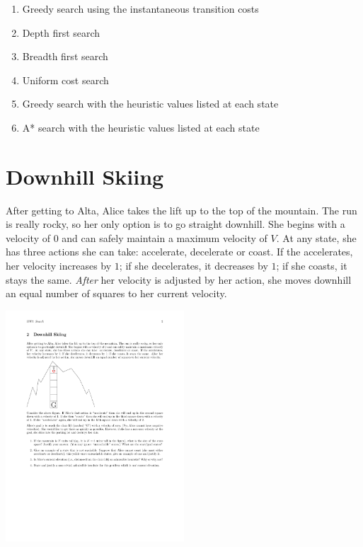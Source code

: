 
\begin{enumerate}
\item Greedy search using the instantaneous transition costs
\item Depth first search
\item Breadth first search
\item Uniform cost search
\item Greedy search with the heuristic values listed at each state
\item A* search with the heuristic values listed at each state
\end{enumerate}

\newpage
\section{Downhill Skiing}

After getting to Alta, Alice takes the lift up to the top of the
mountain.  The run is really rocky, so her only option is to go
straight downhill.  She begins with a velocity of $0$ and can safely
maintain a maximum velocity of $V$.  At any state, she has three
actions she can take: accelerate, decelerate or coast.  If the
accelerates, her velocity increases by $1$; if she decelerates, it
decreases by $1$; if she coasts, it stays the same.  \emph{After} her
velocity is adjusted by her action, she moves downhill an equal number
of squares to her current velocity.

\includegraphics[width=0.5\textwidth]{hw1-skiing.pdf}

